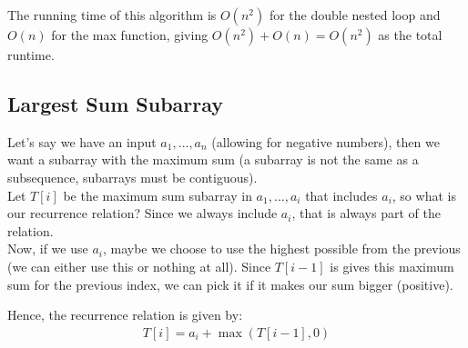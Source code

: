 \documentclass[14pt]{extarticle}
\begin{document}
    The running time of this algorithm is $O(n^2)$ for the double nested loop
    and $O(n)$ for the max function, giving $O(n^2) + O(n) = O(n^2)$ as
    the total runtime.

    \subsection*{Largest Sum Subarray}
    Let's say we have an input $a_1, \ldots, a_n$ (allowing for negative
    numbers), then we want a subarray with the maximum sum (a subarray
    is not the same as a subsequence, subarrays must be contiguous).\\

    Let $T[i]$ be the maximum sum subarray in $a_1, \ldots, a_i$ that
    includes $a_i$, so what is our recurrence relation? Since we always
    include $a_i$, that is always part of the relation.\\

    Now, if we use $a_i$, maybe we choose to use the highest possible
    from the previous (we can either use this or nothing at all). Since
    $T[i-1]$ is gives this maximum sum for the previous index, we can pick
    it if it makes our sum bigger (positive).

    Hence, the recurrence relation is given by:
    \begin{align*}
        T[i] = a_i + \max(T[i-1], 0)
    \end{align*}
\end{document}
